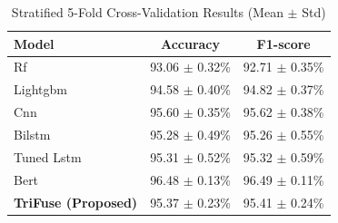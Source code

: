 \begin{table}[htbp]
\caption{Stratified 5-Fold Cross-Validation Results (Mean $\pm$ Std)}
\label{tab:cross_val}
\centering
\begin{tabular}{|l|c|c|}
\hline
Model & Accuracy & F1-score \\
\hline
Rf & 93.06 $\pm$ 0.32\% & 92.71 $\pm$ 0.35\% \\
Lightgbm & 94.58 $\pm$ 0.40\% & 94.82 $\pm$ 0.37\% \\
Cnn & 95.60 $\pm$ 0.35\% & 95.62 $\pm$ 0.38\% \\
Bilstm & 95.28 $\pm$ 0.49\% & 95.26 $\pm$ 0.55\% \\
Tuned Lstm & 95.31 $\pm$ 0.52\% & 95.32 $\pm$ 0.59\% \\
Bert & 96.48 $\pm$ 0.13\% & 96.49 $\pm$ 0.11\% \\
\textbf{TriFuse (Proposed)} & 95.37 $\pm$ 0.23\% & 95.41 $\pm$ 0.24\% \\
\hline
\end{tabular}
\end{table}
